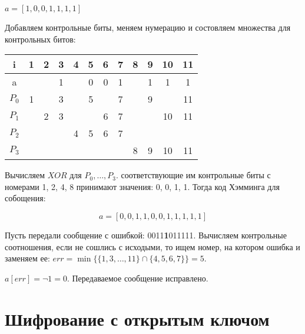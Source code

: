 \begin{eg}
    $a = [1, 0, 0, 1, 1, 1, 1]$

    Добавляем контрольные биты, меняем нумерацию и состовляем множества для контрольных битов:

    \begin{tabular}{|c|c|c|c|c|c|c|c|c|c|c|c|}
        \hline
        i & 1 & 2 & 3 & 4 & 5 & 6 & 7 & 8 & 9 & 10 & 11\\
        \hline
        a &   &   & 1 &   & 0 & 0 & 1 &   & 1 & 1  & 1\\
        \hline
        $P_0$ & 1 & & 3 & &5 & &7 & &9 & &11\\
        $P_1$ & & 2 & 3 & & & 6 & 7 & & & 10 & 11\\
        $P_2$ & & & & 4 & 5 &6 & 7 & & & &\\ 
        $P_3$ & & & & & & & & 8& 9 & 10 & 11\\
        \hline 
    \end{tabular}

    Вычисляем $XOR$ для $P_0, \ldots, P_3$. соответствующие им контрольные биты
    с номерами 1, 2, 4, 8 принимают значения: 0, 0, 1, 1. Тогда код Хэмминга для собощения:
    
    $$a = [0, 0, 1, 1, 0, 0, 1, 1, 1, 1, 1]$$

    Пусть передали сообщение с ошибкой: 0011\textbf{1}011111. Вычисляем контрольные соотношения, если не сошлись с исходыми,
    то ищем номер, на котором ошибка и заменяем ее: $err = \min\{\{1, 3, \ldots, 11\} \cap \{4, 5, 6, 7\}\} = 5$.

    $a[err] = \lnot 1 = 0$. Передаваемое сообщение исправлено.
\end{eg}

\section{Шифрование с открытым ключом}